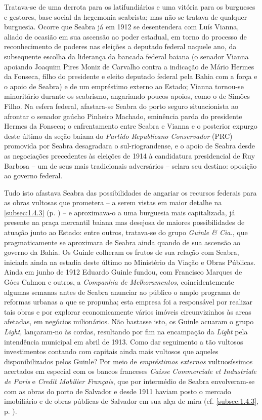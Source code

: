 Tratava-se de uma derrota para os latifundiários e uma vitória para os burgueses e gestores, base social da hegemonia seabrista; mas não se tratava de qualquer burguesia. Ocorre que Seabra já em 1912 se desentendera com Luís Vianna, aliado de ocasião em sua ascensão ao poder estadual, em torno do processo de reconhecimento de poderes nas eleições a deputado federal naquele ano, da subsequente escolha da liderança da bancada federal baiana (o senador Vianna apoiando Joaquim Pires Moniz de Carvalho contra a indicação de Mário Hermes da Fonseca, filho do presidente e eleito deputado federal pela Bahia com a força e o apoio de Seabra) e de um empréstimo externo ao Estado; Vianna tornou-se minoritário durante os seabrismo, angariando poucos apoios, como o de Simões Filho. Na esfera federal, afastara-se Seabra do porto seguro situacionista ao afrontar o senador gaúcho Pinheiro Machado, eminência parda do presidente Hermes da Fonseca; o enfrentamento entre Seabra e Vianna e o posterior expurgo deste último da seção baiana do \textit{Partido Republicano Conservador} (PRC) promovida por Seabra desagradara o sul-riograndense, e o apoio de Seabra desde as negociações precedentes às eleições de 1914 à candidatura presidencial de Ruy Barbosa -- um de seus mais tradicionais adversários -- selara seu destino: oposição ao governo federal.

Tudo isto afastava Seabra das possibilidades de angariar os recursos federais para as obras vultosas que prometera -- a serem vistas em maior detalhe na \autoref{subsec:1.4.3} (p. \pageref{subsec:1.4.3}) -- e aproximava-o a uma burguesia mais capitalizada, já presente na praça mercantil baiana mas desejosa de maiores possibilidades de atuação junto ao Estado: entre outros, tratava-se do grupo \textit{Guinle \& Cia.}, que pragmaticamente se aproximara de Seabra ainda quando de sua ascensão ao governo da Bahia. Os Guinle colheram os frutos de sua relação com Seabra, iniciada ainda na estadia deste último no Ministério da Viação e Obras Públicas. Ainda em junho de 1912 Eduardo Guinle fundou, com Francisco Marques de Góes Calmon e outros, a \textit{Companhia de Melhoramentos}, coincidentemente algumas semanas antes de Seabra anunciar ao público o amplo programa de reformas urbanas a que se propunha; esta empresa foi a responsável por realizar tais obras e por explorar economicamente vários imóveis circunvizinhos às areas afetadas, em negócios milionários. Não bastasse isto, os Guinle acuaram o grupo \textit{Light}, lançaram-no às cordas, resultando por fim na encampação da \textit{Light} pela intendência municipal em abril de 1913. Como dar seguimento a tão vultosos investimentos contando com capitais ainda mais vultosos que aqueles disponibilizados pelos Guinle? Por meio de \textit{empréstimos externos} vultuosíssimos acertados em especial com os bancos franceses \textit{Caisse Commerciale et Industriale de Paris} e \textit{Credit Mobilier Français}, que por intermédio de Seabra envolveram-se com as obras do porto de Salvador e desde 1911 haviam posto o mercado imobiliário e de obras públicas de Salvador em sua alça de mira (cf. \autoref{subsec:1.4.3}, p. \pageref{subsec:1.4.3}). 

